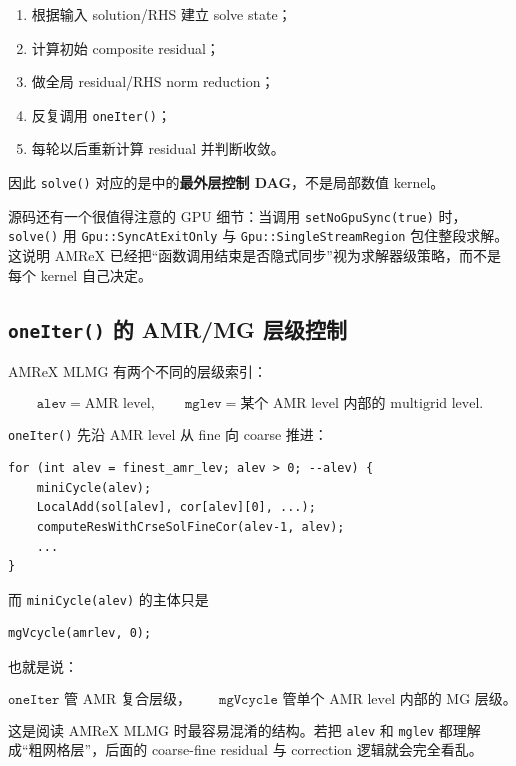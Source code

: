 \begin{enumerate}
\item 根据输入 solution/RHS 建立 solve state；
\item 计算初始 composite residual；
\item 做全局 residual/RHS norm reduction；
\item 反复调用 \texttt{oneIter()}；
\item 每轮以后重新计算 residual 并判断收敛。
\end{enumerate}

因此 \texttt{solve()} 对应的是中的\textbf{最外层控制 DAG}，不是局部数值 kernel。

源码还有一个很值得注意的 GPU 细节：当调用
\texttt{setNoGpuSync(true)} 时，\texttt{solve()} 用
\texttt{Gpu::SyncAtExitOnly} 与
\texttt{Gpu::SingleStreamRegion}
包住整段求解。这说明 AMReX 已经把“函数调用结束是否隐式同步”视为求解器级策略，而不是每个 kernel 自己决定。

\subsection{\texttt{oneIter()} 的 AMR/MG 层级控制}

AMReX MLMG 有两个不同的层级索引：

\begin{equation}
\boxed{
\texttt{alev}
=
\text{AMR level},
\qquad
\texttt{mglev}
=
\text{某个 AMR level 内部的 multigrid level}.
}
\label{eq:software-amrex-two-hierarchies}
\end{equation}

\texttt{oneIter()} 先沿 AMR level 从 fine 向 coarse 推进：
\begin{verbatim}
for (int alev = finest_amr_lev; alev > 0; --alev) {
    miniCycle(alev);
    LocalAdd(sol[alev], cor[alev][0], ...);
    computeResWithCrseSolFineCor(alev-1, alev);
    ...
}
\end{verbatim}

而 \texttt{miniCycle(alev)} 的主体只是
\begin{verbatim}
mgVcycle(amrlev, 0);
\end{verbatim}

也就是说：

\begin{equation}
\boxed{
\texttt{oneIter}
\text{ 管 AMR 复合层级，}
\qquad
\texttt{mgVcycle}
\text{ 管单个 AMR level 内部的 MG 层级。}
}
\end{equation}

这是阅读 AMReX MLMG 时最容易混淆的结构。若把 \texttt{alev} 和 \texttt{mglev} 都理解成“粗网格层”，后面的 coarse-fine residual 与 correction 逻辑就会完全看乱。

